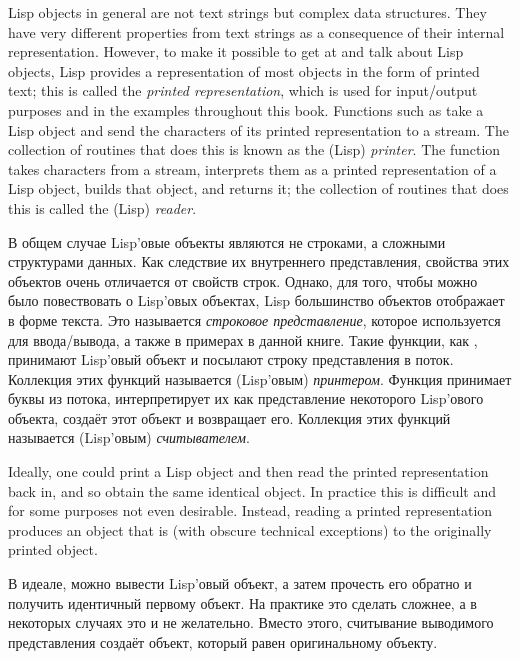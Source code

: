 
Lisp objects in general are not text strings but complex data structures.
They have very different properties from text strings as a consequence of
their internal representation.  However, to make it possible to get at
and talk about Lisp objects, Lisp provides a representation of
most objects in the form of printed text; this is called the \emph{printed
representation}, which is used for input/output purposes and in the
examples throughout this book.  Functions such as  take a
Lisp object and send the characters of its printed representation to a
stream.  The collection of routines that does this is known as the
(Lisp) \emph{printer}.  The  function takes characters from a
stream, interprets them as a printed representation of a Lisp object,
builds that object, and returns it; the collection of routines
that does this is called the (Lisp) \emph{reader}.

В общем случае Lisp'овые объекты являются не строками, а сложными структурами
данных.  Как следствие их внутреннего представления, свойства этих объектов
очень отличается от свойств строк. Однако, для того, чтобы можно было
повествовать о Lisp'овых объектах, Lisp большинство объектов отображает в форме
текста. Это называется \emph{строковое представление}, которое используется для
ввода/вывода, а также в примерах в данной книге. Такие функции, как ,
принимают Lisp'овый объект и посылают строку представления
в поток. Коллекция этих функций называется (Lisp'овым) \emph{принтером}. Функция
 принимает буквы из потока, интерпретирует их как
представление некоторого Lisp'ового объекта, создаёт этот объект и возвращает
его. Коллекция этих функций называется (Lisp'овым) \emph{считывателем}.

Ideally, one could print a Lisp object and
then read the printed representation back in, and so obtain the same identical
object.  In practice this is difficult and for some purposes not even desirable.
Instead, reading a printed representation produces an object that is (with
obscure technical exceptions)  to the originally printed object.

В идеале, можно вывести Lisp'овый объект, а затем прочесть его обратно и
получить идентичный первому объект. На практике это сделать сложнее, а в
некоторых случаях это и не желательно. Вместо этого, считывание выводимого
представления создаёт объект, который равен  оригинальному объекту.

